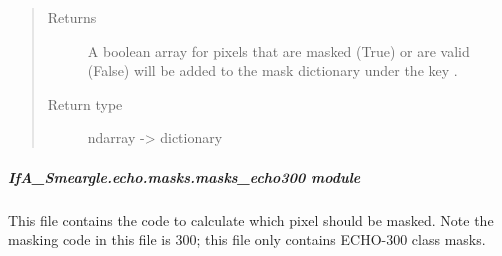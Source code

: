 \documentclass[letterpaper,10pt,english]{sphinxmanual}
\begin{document}
\begin{fulllineitems}
\begin{quote}
\begin{description}
\begin{itemize}
\end{itemize}

\item[{Returns}] \leavevmode
{} \textendash{} A boolean array for pixels that are masked (True) or are valid (False)
will be added to the mask dictionary under the key
.

\item[{Return type}] \leavevmode
ndarray -\textgreater{} dictionary

\end{description}\end{quote}

\end{fulllineitems}



\subparagraph{IfA\_Smeargle.echo.masks.masks\_echo300 module}
\label{\detokenize{python_docstrings/IfA_Smeargle.echo.masks.masks_echo300:module-IfA_Smeargle.echo.masks.masks_echo300}}\label{\detokenize{python_docstrings/IfA_Smeargle.echo.masks.masks_echo300:ifa-smeargle-echo-masks-masks-echo300-module}}\label{\detokenize{python_docstrings/IfA_Smeargle.echo.masks.masks_echo300::doc}}
This file contains the code to calculate which pixel should be masked. Note the masking code
in this file is 300; this file only contains ECHO-300 class masks.
\end{document}
